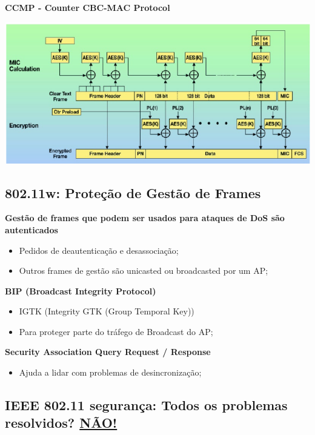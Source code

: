 \documentclass{article}
\begin{document}
\textbf{CCMP - Counter CBC-MAC Protocol}

\begin{center}
  \includegraphics[scale=0.6]{59}
\end{center}


\subsection{802.11w: Proteção de Gestão de Frames}

\begin{flushleft}
  \textbf{Gestão de frames que podem ser usados
  para ataques de DoS são autenticados}
  \begin{itemize}
    \item Pedidos de deautenticação e desassociação;
    \item Outros frames de gestão são unicasted ou broadcasted por um AP;
  \end{itemize}

  \textbf{BIP (Broadcast Integrity Protocol)}
  \begin{itemize}
    \item IGTK (Integrity GTK (Group Temporal Key))
    \item Para proteger parte do tráfego de Broadcast do AP;
  \end{itemize}

  \textbf{Security Association Query Request / Response}
  \begin{itemize}
    \item Ajuda a lidar com problemas de desincronização;
  \end{itemize}
\end{flushleft}

\subsection{IEEE 802.11 segurança: Todos os problemas resolvidos? \uline{NÃO!}}
\end{document}
